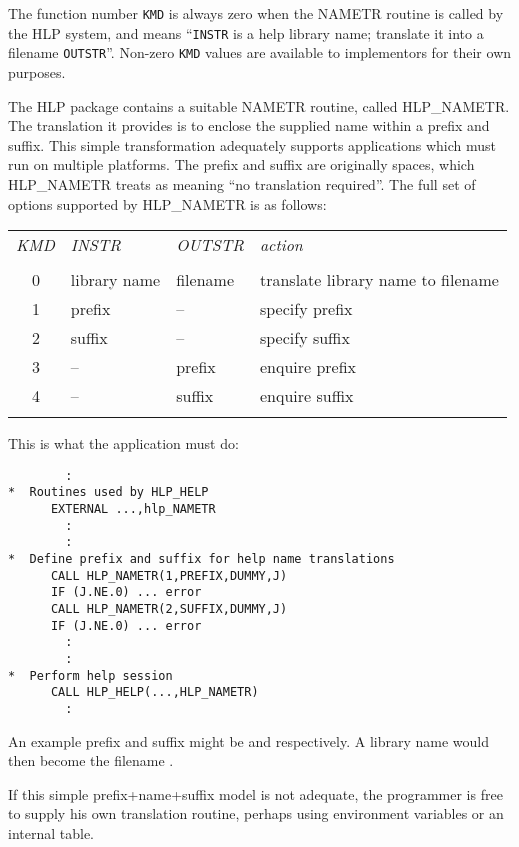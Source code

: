 The function number {\tt KMD} is always zero when the NAMETR routine
is called by the HLP system, and means ``{\tt INSTR} is a help
library name; translate it into a filename {\tt OUTSTR}''.  Non-zero
{\tt KMD} values are available to implementors for their own
purposes.

The HLP package contains a suitable NAMETR routine, called
HLP\_NAMETR.  The translation it provides is to
enclose the supplied name within a prefix and suffix.  This
simple transformation adequately supports applications
which must run on multiple platforms.
The prefix and
suffix are originally spaces, which HLP\_NAMETR treats as meaning
``no translation required''.  The full set of options supported by
HLP\_NAMETR is as follows:

\begin{tabular}{llll}
\\
{\it KMD} & {\it INSTR} & {\it OUTSTR} & {\it action} \\ \\
~~0 & library name & filename & translate library name to filename \\
~~1 & prefix & -- & specify prefix \\
~~2 & suffix & -- & specify suffix \\
~~3 & -- & prefix & enquire prefix \\
~~4 & -- & suffix & enquire suffix \\ \\
\end{tabular}

This is what the application must do:
\begin{verbatim}
        :
*  Routines used by HLP_HELP
      EXTERNAL ...,hlp_NAMETR
        :
        :
*  Define prefix and suffix for help name translations
      CALL HLP_NAMETR(1,PREFIX,DUMMY,J)
      IF (J.NE.0) ... error
      CALL HLP_NAMETR(2,SUFFIX,DUMMY,J)
      IF (J.NE.0) ... error
        :
        :
*  Perform help session
      CALL HLP_HELP(...,HLP_NAMETR)
        :
\end{verbatim}
An example prefix and suffix might be  and
 respectively.  A library name  would
then become the filename .

If this simple prefix+name+suffix model is not adequate, the programmer
is free to supply his own translation routine, perhaps using
environment variables or an internal table.

